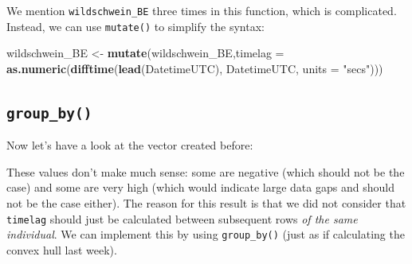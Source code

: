 \documentclass[]{book}
\newenvironment{Shaded}{\begin{snugshade}}{\end{snugshade}}
\newcommand{\CommentTok}[1]{\textcolor[rgb]{0.56,0.35,0.01}{\textit{#1}}}
\newcommand{\DataTypeTok}[1]{\textcolor[rgb]{0.13,0.29,0.53}{#1}}
\newcommand{\KeywordTok}[1]{\textcolor[rgb]{0.13,0.29,0.53}{\textbf{#1}}}
\newcommand{\NormalTok}[1]{#1}
\newcommand{\OperatorTok}[1]{\textcolor[rgb]{0.81,0.36,0.00}{\textbf{#1}}}
\newcommand{\StringTok}[1]{\textcolor[rgb]{0.31,0.60,0.02}{#1}}
\begin{document}
\begin{Shaded}
\end{Shaded}

We mention \texttt{wildschwein\_BE} three times in this function, which is complicated. Instead, we can use \texttt{mutate()} to simplify the syntax:

\begin{Shaded}
\begin{Highlighting}[]
\NormalTok{wildschwein_BE <-}\StringTok{ }\KeywordTok{mutate}\NormalTok{(wildschwein_BE,}\DataTypeTok{timelag =} \KeywordTok{as.numeric}\NormalTok{(}\KeywordTok{difftime}\NormalTok{(}\KeywordTok{lead}\NormalTok{(DatetimeUTC),}
\NormalTok{                                                                      DatetimeUTC,}
                                                                      \DataTypeTok{units =} \StringTok{"secs"}\NormalTok{)))}
\end{Highlighting}
\end{Shaded}

\hypertarget{group_by}{%
\subsection{\texorpdfstring{\texttt{group\_by()}}{group\_by()}}\label{group_by}}

Now let's have a look at the vector created before:

\begin{Shaded}
\end{Shaded}

These values don't make much sense: some are negative (which should not be the case) and some are very high (which would indicate large data gaps and should not be the case either). The reason for this result is that we did not consider that \texttt{timelag} should just be calculated between subsequent rows \emph{of the same individual}. We can implement this by using \texttt{group\_by()} (just as if calculating the convex hull last week).
\end{document}

